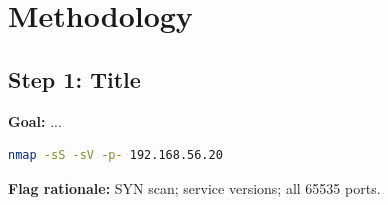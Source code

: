 \section{Methodology}
\subsection{Step 1: Title}
\textbf{Goal:} ...

\begin{lstlisting}[language=bash]
nmap -sS -sV -p- 192.168.56.20
\end{lstlisting}
\textbf{Flag rationale:}  SYN scan;  service versions;  all 65535 ports.

